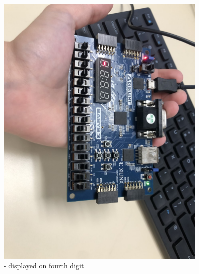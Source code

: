 \documentclass[11pt]{article}
\begin{document}
\begin{figure}[ht]\centering 
	\includegraphics[width= 0.9\textwidth]{b10.png}
	\caption{- displayed on fourth digit}
	\label{fig: pic9}
\end{figure}
\end{document}
